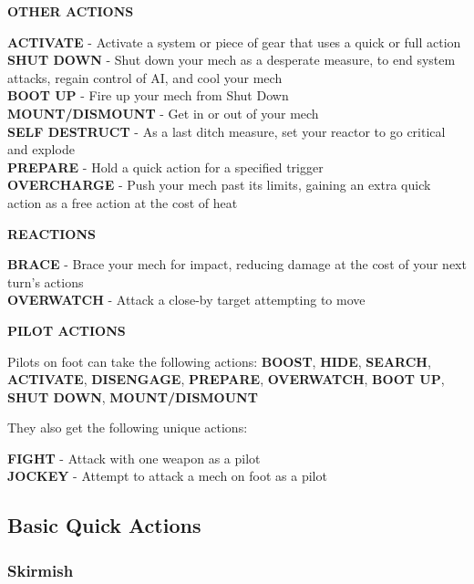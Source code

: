 \begin{center}
    \textbf{OTHER ACTIONS}
\end{center}
\textbf{ACTIVATE} - Activate a system or piece of gear that uses a quick or full action\\
\textbf{SHUT DOWN} - Shut down your mech as a desperate measure, to end system attacks, regain control of AI, and cool your mech\\
\textbf{BOOT UP} - Fire up your mech from Shut Down\\
\textbf{MOUNT/DISMOUNT} - Get in or out of your mech\\
\textbf{SELF DESTRUCT} - As a last ditch measure, set your reactor to go critical and explode\\
\textbf{PREPARE} - Hold a quick action for a specified trigger\\
\textbf{OVERCHARGE} - Push your mech past its limits, gaining an extra quick action as a free action at the cost of heat

\begin{center}
    \textbf{REACTIONS}
\end{center}
\textbf{BRACE} - Brace your mech for impact, reducing damage at the cost of your next turn’s actions\\
\textbf{OVERWATCH} - Attack a close-by target attempting to move

\begin{center}
    \textbf{PILOT ACTIONS}
\end{center}
Pilots on foot can take the following actions: \textbf{BOOST}, \textbf{HIDE}, \textbf{SEARCH}, \textbf{ACTIVATE}, \textbf{DISENGAGE}, \textbf{PREPARE}, \textbf{OVERWATCH}, \textbf{BOOT UP}, \textbf{SHUT DOWN}, \textbf{MOUNT/DISMOUNT}

They also get the following unique actions:

\textbf{FIGHT} - Attack with one weapon as a pilot \\
\textbf{JOCKEY} - Attempt to attack a mech on foot as a pilot



\subsection{Basic Quick Actions}
                       
\subsubsection{Skirmish}

